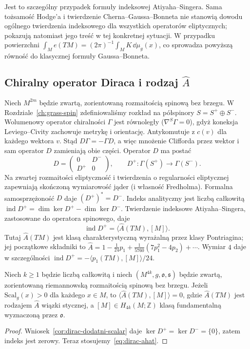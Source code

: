 Jest to szczególny przypadek formuły indeksowej
Atiyaha--Singera. Sama tożsamość Hodge'a i twierdzenie
Cherna--Gaussa--Bonneta nie stanowią dowodu ogólnego
twierdzenia indeksowego dla wszystkich operatorów
eliptycznych; pokazują natomiast jego treść w tej
konkretnej sytuacji. W przypadku powierzchni
$\int_M e(TM)=(2\pi)^{-1}\int_M K\,\dd\mu_g(x)$, co sprowadza
powyższą równość do klasycznej formuły Gaussa--Bonneta.

\subsection{Chiralny operator Diraca i rodzaj \texorpdfstring{$\widehat A$}{A-hat}}

Niech $M^{2m}$ będzie zwartą, zorientowaną
rozmaitością spinową bez brzegu.
W Rozdziale~\ref{ch:grass-spin} zdefiniowaliśmy
rozkład na półspinory $S=S^+\oplus S^-$.
Wolumenowy operator chiralności $\Gamma$ jest
równoległy ($\nabla^S\Gamma=0$), gdyż koneksja
Leviego--Civity zachowuje metrykę i orientację.
Antykomutuje z $c(v)$ dla każdego wektora $v$.
Stąd $D\Gamma=-\Gamma D$, a więc mnożenie Clifforda
przez wektor i sam operator $D$ zamieniają
obie części. Operator $D$ ma postać
\[
 D=\begin{pmatrix}0&D^-\\D^+&0\end{pmatrix},
 \qquad D^+:\Gamma(S^+)\longrightarrow\Gamma(S^-).
\]
Na zwartej rozmaitości eliptyczność i twierdzenia
o regularności eliptycznej zapewniają skończoną
wymiarowość jąder (i własność Fredholma).
Formalna samosprzężoność $D$ daje $(D^+)^*=D^-$. Indeks analityczny jest liczbą całkowitą
$\operatorname{ind}D^+=\dim\ker D^+-\dim\ker D^-$.
Twierdzenie indeksowe Atiyaha--Singera, zastosowane
do operatora spinowego, daje
\begin{equation}\label{eq:dirac-ahat}
 \operatorname{ind}D^+=\langle\widehat A(TM),[M]\rangle.
\end{equation}
Tutaj $\widehat A(TM)$ jest klasą charakterystyczną
wyrażalną przez klasy Pontriagina; jej początkowe
składniki to
$\widehat A=1-\tfrac1{24}p_1
+\tfrac1{5760}(7p_1^2-4p_2)+\cdots$.
Wymiar $4$ daje w szczególności
$\operatorname{ind}D^+=-\langle p_1(TM),[M]\rangle/24$.

\begin{wniosek}
\label{cor:dirac-ahat-dodatni-scalar}
Niech $k\geq1$ będzie liczbą całkowitą i niech
$(M^{4k},g,\mathfrak o,\mathfrak s)$ będzie zwartą,
zorientowaną riemannowską rozmaitością spinową bez brzegu.
Jeżeli $\mathrm{Scal}_g(x)>0$ dla każdego $x\in M$,
to $\langle\widehat A(TM),[M]\rangle=0$,
gdzie $\widehat A(TM)$ jest rodzajem $\widehat A$
wiązki stycznej, a $[M]\in H_{4k}(M;\mathbb Z)$
klasą fundamentalną wyznaczoną przez $\mathfrak o$.
\end{wniosek}
\begin{proof}
Wniosek~\ref{cor:dirac-dodatni-scalar} daje
$\ker D^+=\ker D^-=\{0\}$, zatem indeks jest
zerowy. Teraz stosujemy~\eqref{eq:dirac-ahat}.
\end{proof}

